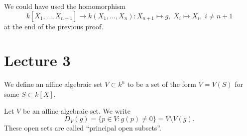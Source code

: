 \begin{remark}
    We could have used the homomorphism 
    \begin{equation}
        k[X_1,\dots,X_{n+1}]\rightarrow k(X_1,\dots,X_n):X_{n+1}\mapsto g,\;X_i\mapsto X_i,\;i\neq n+1
    \end{equation}
    at the end of the previous proof.
\end{remark}

\section{Lecture 3}
\begin{dang}
    \begin{definition}
        We define an affine algebraic set $V\subset k^n$ to be a set of the form $V=V(S)$ for 
        some $S\subset k[\underline{X}]$.
    \end{definition}
\end{dang}

\begin{notation}
    Let $V$ be an affine algebraic set. We write 
    \begin{equation}
        D_V(g) = \{p\in V: g(p)\neq0\} = V\setminus V(g).
    \end{equation}
    These open sets are called ``principal open subsets''.
\end{notation}

